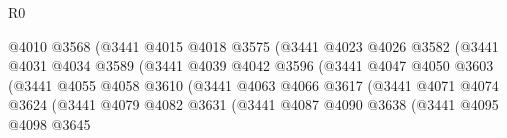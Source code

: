 \begin{lexlean}{R0}
\begin{coremodule}
                                        @4010
                                        @3568
                                        (@3441
                                          @4015
                                          @4018
                                          @3575
                                          (@3441
                                            @4023
                                            @4026
                                            @3582
                                            (@3441
                                              @4031
                                              @4034
                                              @3589
                                              (@3441
                                                @4039
                                                @4042
                                                @3596
                                                (@3441
                                                  @4047
                                                  @4050
                                                  @3603
                                                  (@3441
                                                    @4055
                                                    @4058
                                                    @3610
                                                    (@3441
                                                      @4063
                                                      @4066
                                                      @3617
                                                      (@3441
                                                        @4071
                                                        @4074
                                                        @3624
                                                        (@3441
                                                          @4079
                                                          @4082
                                                          @3631
                                                          (@3441
                                                            @4087
                                                            @4090
                                                            @3638
                                                            (@3441
                                                              @4095
                                                              @4098
                                                              @3645

\end{coremodule}
\end{lexlean}
